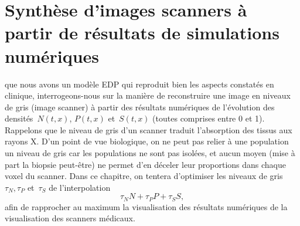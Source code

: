 \documentclass[main.tex]{subfiles}
\begin{document}
\chapter{Synthèse d'images scanners à partir de résultats de simulations numériques \label{chap:optim_grey}}

 que nous avons un modèle EDP qui reproduit bien les aspects constatés en clinique, interrogeons-nous sur la manière de reconstruire une image en niveaux de gris (image scanner) à partir des résultats numériques \ie de l'évolution des densités~$N(t,x)$, $P(t,x)$ et~$S(t,x)$ (toutes comprises entre 0 et 1). Rappelons que le niveau de gris d'un scanner traduit l'absorption des tissus aux rayons X. D'un point de vue biologique,  on ne peut pas relier à une population un niveau de gris car les populations ne sont pas isolées, et aucun moyen (mise à part la biopsie peut-être) ne permet d'en déceler leur proportions dans chaque voxel du scanner. 
Dans ce chapitre, on tentera d'optimiser les niveaux de gris~$\tau_N, \tau_P$ et~$\tau_S$ de l'interpolation 
\begin{equation}\label{eq:nvx_gris}
\tau_N N + \tau_P P + \tau_S S,
\end{equation}
 afin de rapprocher au maximum la visualisation des résultats numériques de la visualisation des scanners médicaux.
\end{document}
